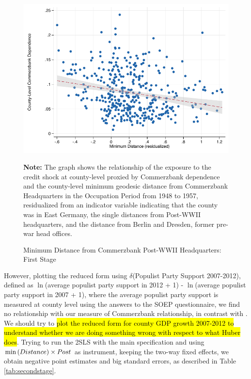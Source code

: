 \documentclass[11pt]{article}
\begin{document}
\begin{figure}[htbp!]
    \centering
    \caption{Minimum Distance from Commerzbank Post-WWII Headquarters: First Stage}\label{fig:distancefirst}
    \includegraphics[width=1\linewidth]{first_stage_graph}
    \begin{tablenotes}
        \footnotesize
        \item \textbf{Note:} The graph shows the relationship of the exposure to the credit shock at county-level proxied by Commerzbank dependence and the county-level minimum geodesic distance from Commerzbank Headquarters in the Occupation Period from 1948 to 1957, residualized from an indicator variable indicating that the county was in East Germany, the single distances from Post-WWII headquarters, and the distance from Berlin and Dresden, former pre-war head offices.
    \end{tablenotes} 
\end{figure}

However, plotting the reduced form using $\delta$(Populist Party Support 2007-2012), defined as $\ln$(average populist party support in 2012 + 1) - $\ln$(average populist party support in 2007 + 1), where the average populist party support is measured at county level using the answers to the SOEP questionnaire, we find no relationship with our measure of Commerzbank relationship, in contrast with \citet{bib:huber2018}. We should try to \hl{plot the reduced form for county GDP growth 2007-2012 to understand whether we are doing something wrong with respect to what Huber does}. Trying to run the 2SLS with the main specification and using $\min\left( Distance \right) \times Post$ as instrument, keeping the two-way fixed effects, we obtain negative point estimates and big standard errors, as described in Table \ref{tab:secondstage}.
\end{document}
